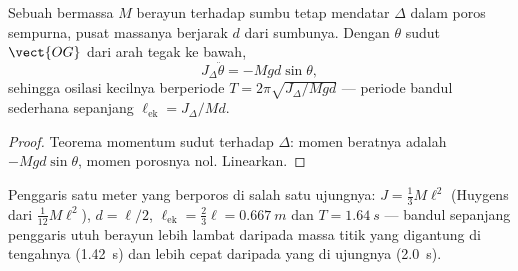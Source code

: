 \begin{proposition}\label{prop:b2:rigid-body-mechanics:pendulum}
Sebuah  bermassa $M$ berayun terhadap sumbu tetap mendatar
$\Delta$ dalam poros sempurna, pusat massanya berjarak $d$ dari sumbunya.
Dengan $\theta$ sudut $\vect{OG}$ dari arah tegak ke bawah,
\[
J_\Delta\ddot\theta = -Mgd\sin\theta ,
\]
sehingga osilasi kecilnya berperiode $T = 2\pi\sqrt{J_\Delta/Mgd}$ ---
periode bandul sederhana sepanjang $\ell_{\text{ek}} = J_\Delta/Md$.
\end{proposition}

\begin{proof}
Teorema momentum sudut terhadap $\Delta$: momen beratnya adalah
$-Mgd\sin\theta$, momen porosnya nol. Linearkan.
\end{proof}

\begin{example}\label{ex:b2:rigid-body-mechanics:rule}
Penggaris satu meter yang berporos di salah satu ujungnya:
$J = \tfrac13M\ell^2$ (Huygens dari $\tfrac1{12}M\ell^2$), $d = \ell/2$,
$\ell_{\text{ek}} = \tfrac23\ell =
\qty{0.667}{m}$ dan $T = \qty{1.64}{s}$ --- bandul sepanjang penggaris
utuh berayun lebih lambat daripada massa titik yang digantung di
tengahnya (\qty{1.42}{s}) dan lebih cepat daripada yang di ujungnya
(\qty{2.0}{s}).
\end{example}

